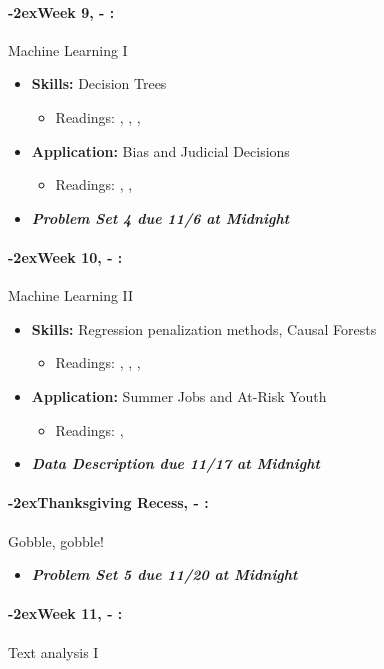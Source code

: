 \documentclass[11pt]{article}
\newcommand{\week}[1]{%
  \paragraph*{\kern-2ex\quad #1, \AdvanceDate[1]\syldate{\today} - \AdvanceDate[2]\syldate{\today}:}%
  \ifdim\wd1=\wd\MONDAY
    \AdvanceDate[7]
  \else
    \AdvanceDate[7]
  \fi%
}
\begin{document}
\week{Week 9} Machine Learning I
\begin{itemize}
  \item \textbf{Skills:} Decision Trees
  \begin{itemize}
    \item Readings: \textbf{\cite{athey2019machine}}, \textbf{\cite{varian2014bigdata}}, \cite{mullainathan2017machine}, \cite{kleinberg2015prediction}
  \end{itemize}
  \item \textbf{Application:} Bias and Judicial Decisions
  \begin{itemize}
    \item Readings: \textbf{\cite{kleinberg2018human}}, \cite{bertrand2004emily}, \cite{simonsohn2023bertrand}
  \end{itemize}
  \item \textit{\textbf{Problem Set 4 due 11/6 at Midnight}}
\end{itemize}
\week{Week 10} Machine Learning II
\begin{itemize}
  \item \textbf{Skills:} Regression penalization methods, Causal Forests
  \begin{itemize}
    \item Readings: \textbf{\cite{athey2019machine}}, \cite{varian2014bigdata}, \cite{mullainathan2017machine}, \cite{kleinberg2015prediction}
  \end{itemize}
  \item \textbf{Application:} Summer Jobs and At-Risk Youth
  \begin{itemize}
    \item Readings: \textbf{\cite{davis2017summer}}, \cite{naik2014streetscore}
  \end{itemize}
  \item \textit{\textbf{Data Description due 11/17 at Midnight}}
\end{itemize}
\week{Thanksgiving Recess} Gobble, gobble! 
\begin{itemize}
  \item \textit{\textbf{Problem Set 5 due 11/20 at Midnight}}
\end{itemize}
\week{Week 11} Text analysis I
\end{document}
